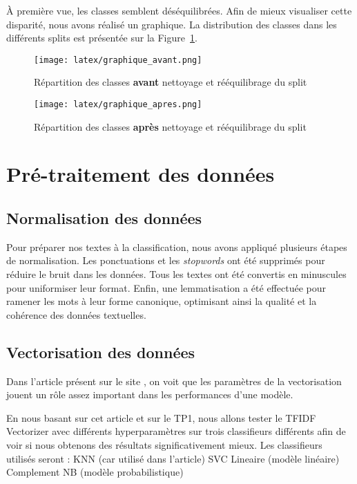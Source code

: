 \documentclass[11pt]{article}
\begin{document}
À première vue, les classes semblent déséquilibrées. Afin de mieux visualiser cette disparité, nous avons réalisé un graphique. La distribution des classes dans les différents splits est présentée sur la Figure~\ref{fig:graph_avant}.

\begin{figure}[H]
  \texttt{[image: latex/graphique\_avant.png]}
  \caption{Répartition des classes \textbf{avant} nettoyage et rééquilibrage du split}
  \label{fig:graph_avant} %
\end{figure}



\begin{figure}[H]
  \texttt{[image: latex/graphique\_apres.png]}
  \caption{Répartition des classes \textbf{après} nettoyage et rééquilibrage du split}
  \label{fig:graph_apres} %
\end{figure}


\section{Pré-traitement des données}
\subsection{Normalisation des données}
Pour préparer nos textes à la classification, nous avons appliqué plusieurs étapes de normalisation. Les ponctuations et les \textit{stopwords} ont été supprimés pour réduire le bruit dans les données. Tous les textes ont été convertis en minuscules pour uniformiser leur format. Enfin, une lemmatisation a été effectuée pour ramener les mots à leur forme canonique, optimisant ainsi la qualité et la cohérence des données textuelles.

\subsection{Vectorisation des données}
Dans l'article présent sur le site \cite{forest2009variation}, on voit que les paramètres de la vectorisation jouent un rôle assez important dans les performances d'une modèle.

En nous basant sur cet article et sur le TP1, nous allons tester le TFIDF Vectorizer avec différents hyperparamètres sur trois classifieurs différents afin de voir si nous obtenons des résultats significativement mieux. Les classifieurs utilisés seront : KNN (car utilisé dans l'article) SVC Lineaire (modèle linéaire) Complement NB (modèle probabilistique)
\end{document}
